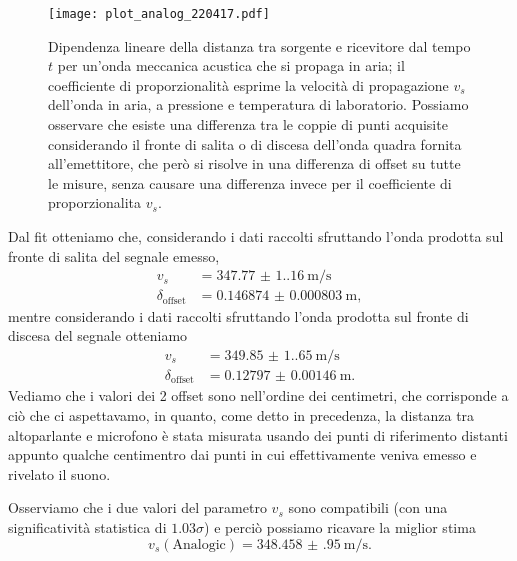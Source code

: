 \documentclass[
    rmp,
    reprint, 
    superscriptaddress, 
    altaffilletter, 
    amsmath, 
    amssymb, 
    a4paper,
    varvw]{revtex4-2}
\begin{document}
\begin{figure}[!t]
    \centering
    \texttt{[image: plot\_analog\_220417.pdf]}
    \caption{Dipendenza lineare della distanza tra sorgente e ricevitore dal tempo $t$ per un'onda meccanica acustica che si propaga in aria; il coefficiente di proporzionalità esprime la velocità di propagazione $v_s$ dell'onda in aria, a pressione e temperatura di laboratorio. Possiamo osservare che esiste una differenza tra le coppie di punti acquisite considerando il fronte di salita o di discesa dell'onda quadra fornita all'emettitore, che però si risolve in una differenza di offset su tutte le misure, senza causare una differenza invece per il coefficiente di proporzionalita $v_s$.}\label{fig:analog_plot_d1}
\end{figure}

Dal fit otteniamo che, considerando i dati raccolti sfruttando l'onda prodotta sul fronte di salita del segnale emesso, \begin{align*}
    v_s &=\SI{347.77(1.16)}{\metre\per\second}\\
    \delta_\text{offset} &=\SI{0.146874(803)}{\metre},
\end{align*} mentre considerando i dati raccolti sfruttando l'onda prodotta sul fronte di discesa del segnale otteniamo \begin{align*}
    v_s &=\SI{349.85(1.65)}{\metre\per\second}\\
    \delta_\text{offset} &=\SI{0.12797(146)}{\metre}.
\end{align*}
Vediamo che i valori dei 2 offset sono nell'ordine dei centimetri, che corrisponde a ciò che ci aspettavamo, in quanto, come detto in precedenza, la distanza tra altoparlante e microfono è stata misurata usando dei punti di riferimento distanti appunto qualche centimentro dai punti in cui effettivamente veniva emesso e rivelato il suono. 

Osserviamo che i due valori del parametro $v_s$ sono compatibili (con una significatività statistica di $1.03\sigma$) e perciò possiamo ricavare la miglior stima \[v_s(\text{Analogic})=\SI{348.458(950)}{\metre\per\second}.\]
\end{document}
